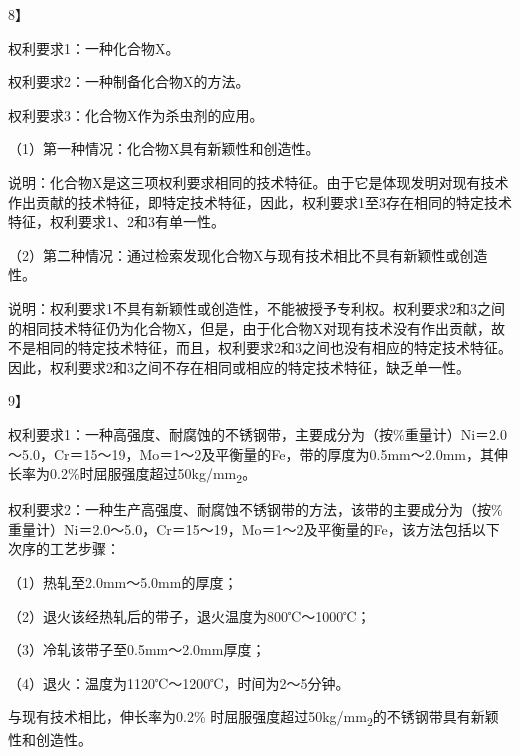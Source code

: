 {8{\kaiti 】}\par}

权利要求1：一种化合物X。

权利要求2：一种制备化合物X的方法。

权利要求3：化合物X作为杀虫剂的应用。

{\setlength{\parindent}{17.1bp}（1）第一种情况：化合物X具有新颖性和创造性。\par}

说明：化合物X是这三项权利要求相同的技术特征。由于它是体现发明对现有技术作出贡献的技术特征，即特定技术特征，因此，权利要求1至3存在相同的特定技术特征，权利要求1、2和3有单一性。

{\setlength{\parindent}{17.1bp}（2）第二种情况：通过检索发现化合物X与现有技术相比不具有新颖性或创造性。\par}

说明：权利要求1不具有新颖性或创造性，不能被授予专利权。权利要求2和3之间的相同技术特征仍为化合物X，但是，由于化合物X对现有技术没有作出贡献，故不是相同的特定技术特征，而且，权利要求2和3之间也没有相应的特定技术特征。因此，权利要求2和3之间不存在相同或相应的特定技术特征，缺乏单一性。

{9{\kaiti 】}\par}

权利要求1：一种高强度、耐腐蚀的不锈钢带，主要成分为（按\%重量计）Ni＝2.0～5.0，Cr＝15～19，Mo＝1～2及平衡量的Fe，带的厚度为0.5mm～2.0mm，其伸长率为0.2\%时屈服强度超过50kg/mm\textsubscript{2}。

权利要求2：一种生产高强度、耐腐蚀不锈钢带的方法，该带的主要成分为（按\%重量计）Ni＝2.0～5.0，Cr＝15～19，Mo＝1～2及平衡量的Fe，该方法包括以下次序的工艺步骤：

{\setlength{\parindent}{17.1bp}（1）热轧至2.0mm～5.0mm的厚度；\par}

{\setlength{\parindent}{17.1bp}（2）退火该经热轧后的带子，退火温度为800℃～1000℃；\par}

{\setlength{\parindent}{17.1bp}（3）冷轧该带子至0.5mm～2.0mm厚度；\par}

{\setlength{\parindent}{17.1bp}（4）退火：温度为1120℃～1200℃，时间为2～5分钟。\par}

与现有技术相比，伸长率为0.2\% 时屈服强度超过50kg/mm\textsubscript{2}的不锈钢带具有新颖性和创造性。

